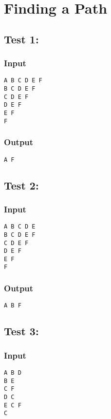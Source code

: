 \documentclass[twocolumn,9pt]{extarticle}
\begin{document}
\newpage
\section{Finding a Path}
\subsection*{Test 1:}
\subsubsection*{Input}
\texttt{A B C D E F\\
B C D E F\\
C D E F\\
D E F\\
E F\\
F}

\subsubsection*{Output}
\texttt{A F}

\subsection*{Test 2:}
\subsubsection*{Input}
\texttt{A B C D E\\
B C D E F\\
C D E F\\
D E F\\
E F\\
F}

\subsubsection*{Output}
\texttt{A B F}

\subsection*{Test 3:}
\subsubsection*{Input}
\texttt{A B D\\
B E\\
C F\\
D C\\
E C F\\
C}
\end{document}
